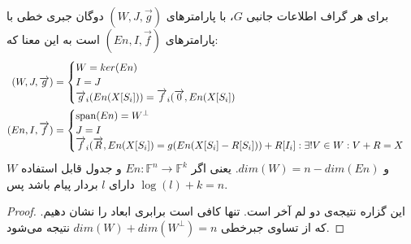 \begin{theorem}
    \label{thm1}
    برای هر گراف اطلاعات جانبی 
    $G$، 
    \lpsicod
    با پارامترهای
     $(W, J, \overrightarrow{g})$
     دوگان جبری خطی
      \lpicod
      با پارامترهای
       $(En, I, \overrightarrow{f})$ 
      است به این معنا که:
    \begin{align*}
    (W, J, \overrightarrow{g}) &= \begin{cases}
                                      W = ker(En)\\
                                      I = J \\
                                      \overrightarrow{g}_i(En(X[S_i])) = \overrightarrow{f}_i(\overrightarrow{0}, En(X[S_i])\\
    \end{cases} \\
    (En, I, \overrightarrow{f}) &= \begin{cases}
                                       \operatorname{span}(En) = W^{\bot} \\
                                       J = I \\
                                       \overrightarrow{f}_i(\overrightarrow{R}, En(X[S_i]) = g(En(X[S_i] - R[S_i])) + R[I_i]: \exists! V \in W: V + R = X \\
    \end{cases}
    \end{align*}
    و 
    $dim(W) = n - dim(En)$.
     یعنی اگر
     $En: \mathbb{F}^n \rightarrow \mathbb{F}^k$
      و جدول قابل استفاده
      $W$
       دارای 
       $l$
       بردار پیام باشد پس 
       $\log(l) + k = n$.
\end{theorem}
\begin{proof}
    این گزاره نتیجه‌ی دو لم آخر است. تنها کافی است برابری ابعاد را نشان دهیم. که از تساوی جبرخطی
    $dim(W) + dim(W^{\bot}) = n$ 
    نتیجه می‌شود.
\end{proof}


